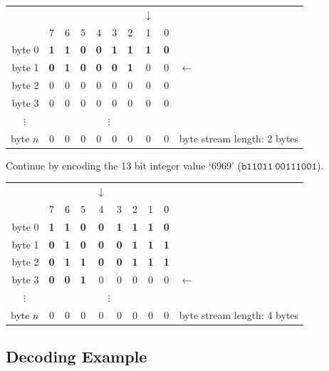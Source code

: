 \documentclass[9pt,letterpaper]{book}
\newcommand{\bin}[1]{\ensuremath{\mathtt{b#1}}}
\numberwithin{equation}{chapter}
\numberwithin{figure}{chapter}
\numberwithin{table}{chapter}
\begin{document}
\begin{tabular}{r|ccccccccl}
\multicolumn{1}{r}{} &&&&&&&$\downarrow$&& \\
         & 7 & 6 & 5 & 4 & 3 & 2 & 1 & 0 & \\\cline{1-9}
byte 0   & \textbf{1} & \textbf{1} & \textbf{0} & \textbf{0} &
           \textbf{1} & \textbf{1} & \textbf{1} & \textbf{0} & \\
byte 1   & \textbf{0} & \textbf{1} & \textbf{0} & \textbf{0} &
           \textbf{0} & \textbf{1} & 0 & 0 & $\leftarrow$      \\
byte 2   & 0 & 0 & 0 & 0 & 0 & 0 & 0 & 0 &                     \\
byte 3   & 0 & 0 & 0 & 0 & 0 & 0 & 0 & 0 &                     \\
\multicolumn{1}{c|}{$\vdots$}&\multicolumn{8}{c}{$\vdots$}&    \\
byte $n$ & 0 & 0 & 0 & 0 & 0 & 0 & 0 & 0 &
byte stream length: 2 bytes
\end{tabular}
\vspace{\baselineskip}

Continue by encoding the 13 bit integer value `6969' (\bin{11011\ 00111001}).

\begin{tabular}{r|ccccccccl}
\multicolumn{1}{r}{} &&&&$\downarrow$&&&&& \\
         & 7 & 6 & 5 & 4 & 3 & 2 & 1 & 0 &            \\\cline{1-9}
byte 0   & \textbf{1} & \textbf{1} & \textbf{0} & \textbf{0} &
           \textbf{1} & \textbf{1} & \textbf{1} & \textbf{0} & \\
byte 1   & \textbf{0} & \textbf{1} & \textbf{0} & \textbf{0} &
           \textbf{0} & \textbf{1} & \textbf{1} & \textbf{1} & \\
byte 2   & \textbf{0} & \textbf{1} & \textbf{1} & \textbf{0} &
           \textbf{0} & \textbf{1} & \textbf{1} & \textbf{1} & \\
byte 3   & \textbf{0} & \textbf{0} & \textbf{1} &
                       0 & 0 & 0 & 0 & 0 & $\leftarrow$        \\
\multicolumn{1}{c|}{$\vdots$}&\multicolumn{8}{c}{$\vdots$}&    \\
byte $n$ & 0 & 0 & 0 & 0 & 0 & 0 & 0 & 0 &
byte stream length: 4 bytes
\end{tabular}
\vspace{\baselineskip}

\subsection{Decoding Example}
\end{document}
